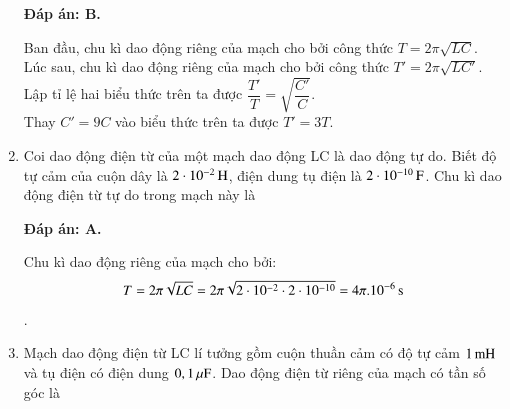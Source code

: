 \begin{enumerate}[label=\bfseries Câu \arabic*:]
	\hideall
	{		\textbf{Đáp án: B.}
		
		Ban đầu, chu kì dao động riêng của mạch cho bởi công thức $T = 2\pi \sqrt{LC}$. \\
		Lúc sau, chu kì dao động riêng của mạch cho bởi công thức $T' = 2\pi \sqrt{LC'}$. \\
		Lập tỉ lệ hai biểu thức trên ta được $\dfrac{T'}{T} = \sqrt{\dfrac{C'}{C}}$. \\
		Thay $C' = 9C$ vào biểu thức trên ta được $T' = 3T$.
		
	}
	
	\item {}
	
	{Coi dao động điện từ của một mạch dao động LC là dao động tự do. Biết độ tự cảm của cuộn dây là $\xsi{2\cdot10^{-2}}{H}$, điện dung tụ điện là $\xsi{2\cdot10^{-10}}{F}$. Chu kì dao động điện từ tự do trong mạch này là
	}
	
	\hideall
	{		\textbf{Đáp án: A.}
		
		Chu kì dao động riêng của mạch cho bởi:
		$$T = 2\pi \sqrt{LC} = 2\pi \sqrt{2\cdot10^{-2} \cdot 2\cdot10^{-10}} = \xsi{4\pi . 10^{-6}}{s}$$.
		
	}
	
	\item {}
	
	{Mạch dao động điện từ LC lí tưởng gồm cuộn thuần cảm có độ tự cảm $\xsi{1}{mH}$ và tụ điện có điện dung $\xsi{0,1}{\mu F}$. Dao động điện từ riêng của mạch có tần số góc là
	}
	

\end{enumerate}
